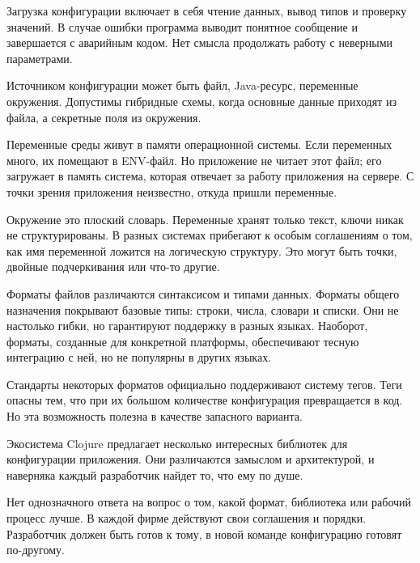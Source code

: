 Загрузка конфигурации включает в себя чтение данных, вывод типов и проверку
значений. В случае ошибки программа выводит понятное сообщение и завершается с
аварийным кодом. Нет смысла продолжать работу с неверными параметрами.

Источником конфигурации может быть файл, Java-ресурс, переменные
окружения. Допустимы гибридные схемы, когда основные данные приходят из файла, а
секретные поля из окружения.

Переменные среды живут в памяти операционной системы. Если переменных много, их
помещают в ENV-файл. Но приложение не читает этот файл; его загружает в память
система, которая отвечает за работу приложения на сервере. С точки зрения
приложения неизвестно, откуда пришли переменные.

Окружение это плоский словарь. Переменные хранят только текст, ключи никак не
структурированы. В разных системах прибегают к особым соглашениям о том, как имя
переменной ложится на логическую структуру. Это могут быть точки, двойные
подчеркивания или что-то другие.

Форматы файлов различаются синтаксисом и типами данных. Форматы общего
назначения покрывают базовые типы: строки, числа, словари и списки. Они не
настолько гибки, но гарантируют поддержку в разных языках. Наоборот, форматы,
созданные для конкретной платформы, обеспечивают тесную интеграцию с ней, но не
популярны в других языках.

Стандарты некоторых форматов официально поддерживают систему тегов. Теги опасны
тем, что при их большом количестве конфигурация превращается в код. Но эта
возможность полезна в качестве запасного варианта.

Экосистема Clojure предлагает несколько интересных библиотек для конфигурации
приложения. Они различаются замыслом и архитектурой, и наверняка каждый
разработчик найдет то, что ему по душе.

Нет однозначного ответа на вопрос о том, какой формат, библиотека или рабочий
процесс лучше. В каждой фирме действуют свои соглашения и порядки. Разработчик
должен быть готов к тому, в новой команде конфигурацию готовят по-другому.
